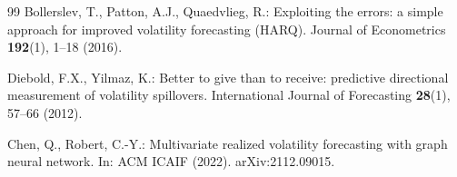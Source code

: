 \documentclass[runningheads]{llncs}
\begin{document}
\begin{thebibliography}{99}
Bollerslev, T., Patton, A.J., Quaedvlieg, R.: Exploiting the errors: a simple approach for improved
volatility forecasting (HARQ). Journal of Econometrics \textbf{192}(1), 1--18 (2016).

Diebold, F.X., Yilmaz, K.: Better to give than to receive: predictive directional measurement of volatility
spillovers. International Journal of Forecasting \textbf{28}(1), 57--66 (2012).

Chen, Q., Robert, C.-Y.: Multivariate realized volatility forecasting with graph neural network.
In: ACM ICAIF (2022). arXiv:2112.09015.

\end{thebibliography}
\end{document}
